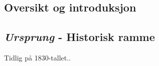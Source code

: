 
\subsection{Oversikt og introduksjon}


\subsection{{\itshape Ursprung} - Historisk ramme}

Tidlig på 1830-tallet..